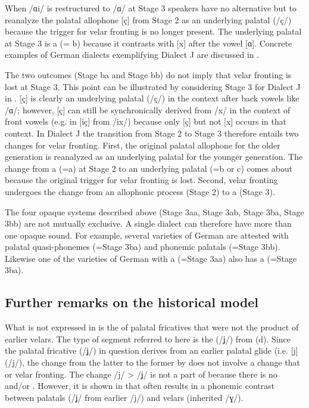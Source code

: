 \begin{xlist}
\begin{xlist}
When /ɑi/ is restructured to /ɑ/ at Stage 3 speakers have no alternative but to reanalyze the palatal allophone [ç] from Stage 2 as an underlying palatal (/ç/) because the trigger for velar fronting is no longer present. The underlying palatal at Stage 3 is a  (= b) because it contrasts with [x] after the vowel [ɑ]. Concrete examples of German dialects exemplifying Dialect J are discussed in .

The two  outcomes (Stage ba and Stage bb) do not imply that velar fronting is lost at Stage 3. This point can be illustrated by considering Stage 3 for Dialect J in . [ç] is clearly an underlying palatal (/ç/) in the context after back vowels like /ɑ/; however, [ç] can still be synchronically derived from /x/ in the context of front vowels (e.g. in [iç] from /ix/) because only [ç] but not [x] occurs in that context. In Dialect J the transition from Stage 2 to Stage 3 therefore entails two changes for velar fronting. First, the original palatal allophone for the older generation is reanalyzed as an underlying palatal for the younger generation. The change from a  (=a) at Stage 2 to an underlying palatal (=b or c) comes about because the original trigger for velar fronting is lost. Second, velar fronting undergoes the change from an allophonic process (Stage 2) to a  (Stage 3).

The four opaque systems described above (Stage 3aa, Stage 3ab, Stage 3ba, Stage 3bb) are not mutually exclusive. A single dialect can therefore have more than one opaque sound. For example, several varieties of German are attested with palatal quasi-phonemes (=Stage 3ba) and phonemic palatals (=Stage 3bb). Likewise one of the varieties of German with a  (=Stage 3aa) also has a  (=Stage 3ba).

\subsection{Further remarks on the historical model}
What is not expressed in  is the  of palatal fricatives that were not the product of earlier velars. The type of segment referred to here is the  (/ʝ/) from (d). Since the palatal fricative (/ʝ/) in question derives from an earlier palatal glide (i.e. [j] (/j/), the change from the latter to the former by  does not involve a change that  or  velar fronting. The change /j/ > /ʝ/ is not a part of  because there is no  and/or . However, it is shown in  that  often results in a phonemic contrast between palatals (/ʝ/ from earlier /j/) and velars (inherited /ɣ/).


\end{xlist}
\end{xlist}
